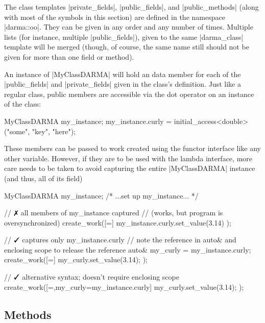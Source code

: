 The class templates |private_fields|, |public_fields|, and |public_methods|
(along with most of the symbols in this section) are defined in the namespace
|darma::oo|.  They can be given in any order and any number of times.
Multiple lists (for instance, multiple |public_fields|), given to the
same |darma_class| template will be merged (though, of course, the same name
still should not be given for more than one field or method).

An instance of |MyClassDARMA| will hold an \ahandleT data member for each of the
|public_fields| and |private_fields| given in the class's definition.  Just like
a regular class, public members are accessible via the dot operator on an
instance of the class:

\begin{CppCodeNumb}
MyClassDARMA my_instance;
my_instance.curly = initial_access<double>("some", "key", "here");
\end{CppCodeNumb}
These members can be passed to work created using the functor interface like any
other variable.  However, if they are to be used with the lambda interface, more
care needs to be taken to avoid capturing the entire |MyClassDARMA| instance
(and thus, all of its field)
\begin{CppCodeNumb}
MyClassDARMA my_instance;
/* ...set up my_instance... */

// $\no$ all members of my_instance captured
// (works, but program is oversynchronized)
create_work([=]{
  my_instance.curly.set_value(3.14)
});

// $\yes$ captures only my_instance.curly
// note the reference in auto& and enclosing scope to release the reference
{
  auto& my_curly = my_instance.curly;
  create_work([=]{
    my_curly.set_value(3.14);
  });
}

// $\yes$ alternative syntax; doesn't require enclosing scope
create_work([=,my_curly=my_instance.curly]{
  my_curly.set_value(3.14);
});
\end{CppCodeNumb}

\subsection{Methods}

